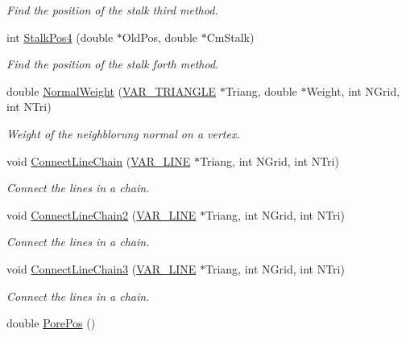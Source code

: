 \begin{DoxyCompactItemize}
\begin{DoxyCompactList}\small\item\em \-Find the position of the stalk third method. \end{DoxyCompactList}\item 
\hypertarget{classVarData_a57ab5d38a7d7936277859f39a525edb4}{int \hyperlink{classVarData_a57ab5d38a7d7936277859f39a525edb4}{\-Stalk\-Pos4} (double $\ast$\-Old\-Pos, double $\ast$\-Cm\-Stalk)}\label{classVarData_a57ab5d38a7d7936277859f39a525edb4}

\begin{DoxyCompactList}\small\item\em \-Find the position of the stalk forth method. \end{DoxyCompactList}\item 
\hypertarget{classVarData_a4af146ff5f41159dbc594bf50a1b1820}{double \hyperlink{classVarData_a4af146ff5f41159dbc594bf50a1b1820}{\-Normal\-Weight} (\hyperlink{structVAR__TRIANGLE}{\-V\-A\-R\-\_\-\-T\-R\-I\-A\-N\-G\-L\-E} $\ast$\-Triang, double $\ast$\-Weight, int \-N\-Grid, int \-N\-Tri)}\label{classVarData_a4af146ff5f41159dbc594bf50a1b1820}

\begin{DoxyCompactList}\small\item\em \-Weight of the neighblorung normal on a vertex. \end{DoxyCompactList}\item 
void \hyperlink{classVarData_abeac0d2b6f91beee12e2506a41eca70c}{\-Connect\-Line\-Chain} (\hyperlink{structVAR__LINE}{\-V\-A\-R\-\_\-\-L\-I\-N\-E} $\ast$\-Triang, int \-N\-Grid, int \-N\-Tri)
\begin{DoxyCompactList}\small\item\em \-Connect the lines in a chain. \end{DoxyCompactList}\item 
void \hyperlink{classVarData_a2e9b9e5912554bc52210356f6e2b1bc8}{\-Connect\-Line\-Chain2} (\hyperlink{structVAR__LINE}{\-V\-A\-R\-\_\-\-L\-I\-N\-E} $\ast$\-Triang, int \-N\-Grid, int \-N\-Tri)
\begin{DoxyCompactList}\small\item\em \-Connect the lines in a chain. \end{DoxyCompactList}\item 
void \hyperlink{classVarData_a1f3c69ce2b4b130fead4373fa76700f3}{\-Connect\-Line\-Chain3} (\hyperlink{structVAR__LINE}{\-V\-A\-R\-\_\-\-L\-I\-N\-E} $\ast$\-Triang, int \-N\-Grid, int \-N\-Tri)
\begin{DoxyCompactList}\small\item\em \-Connect the lines in a chain. \end{DoxyCompactList}\item 
\hypertarget{classVarData_a90139ee28a0c75803648d2b1d85e80ce}{double \hyperlink{classVarData_a90139ee28a0c75803648d2b1d85e80ce}{\-Pore\-Pos} ()}\label{classVarData_a90139ee28a0c75803648d2b1d85e80ce}


\end{DoxyCompactItemize}
